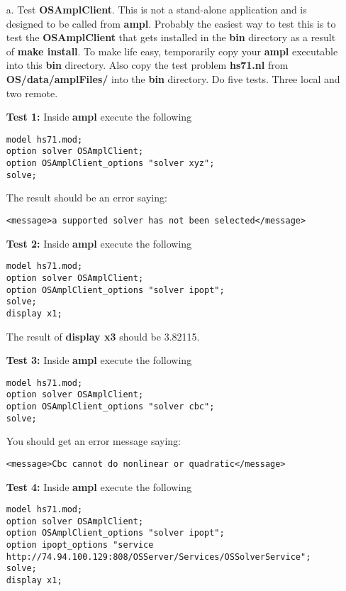 {\begin{itemize}
\begin{itemize}
 
 \item[a.]  Test {\bf OSAmplClient}.  This is not a stand-alone application and is designed to be called from  {\bf ampl}.   Probably the easiest way to test this is to test the {\bf OSAmplClient}  that gets installed in the {\bf bin} directory as a result of {\bf make install}. To make life easy, temporarily copy your {\bf ampl} executable into this {\bf bin} directory.   Also copy the test problem {\bf hs71.nl}  from {\bf OS/data/amplFiles/} into the {\bf bin} directory.   Do five tests. Three local and two remote.
 
 
 \vskip 10pt
 
 
 {\bf Test 1:}  Inside  {\bf ampl} execute the following
 


\begin{verbatim}
model hs71.mod;
option solver OSAmplClient;
option OSAmplClient_options "solver xyz";
solve;
\end{verbatim}

The result should be an error saying:
\begin{verbatim}
<message>a supported solver has not been selected</message>
\end{verbatim}
 
 \vskip 10pt
 
 {\bf Test 2:}  Inside  {\bf ampl} execute the following
 


\begin{verbatim}
model hs71.mod;
option solver OSAmplClient;
option OSAmplClient_options "solver ipopt";
solve;
display x1;
\end{verbatim}

The result of {\bf display x3} should be 3.82115. 


 \vskip 10pt
 
 {\bf Test 3:}  Inside  {\bf ampl} execute the following
 


\begin{verbatim}
model hs71.mod;
option solver OSAmplClient;
option OSAmplClient_options "solver cbc";
solve;
\end{verbatim}

You should get an error message saying:
\begin{verbatim}
<message>Cbc cannot do nonlinear or quadratic</message>
\end{verbatim}


\vskip 10pt

{\small
{\bf Test 4:}  Inside  {\bf ampl} execute the following
\begin{verbatim}
model hs71.mod;
option solver OSAmplClient;
option OSAmplClient_options "solver ipopt";
option ipopt_options "service http://74.94.100.129:808/OSServer/Services/OSSolverService";
solve;
display x1;
\end{verbatim}
}%


\end{itemize}
\end{itemize}}
